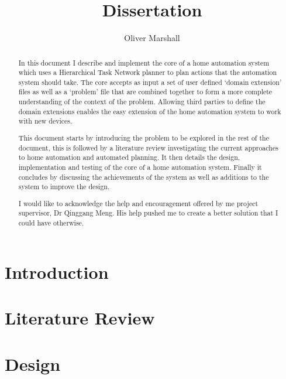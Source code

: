 \documentclass{report}
\begin{document}
% 

\title{Dissertation} \author{Oliver Marshall}

\newpage

\begin{abstract}
  In this document I describe and implement the core of a home automation system
  which uses a Hierarchical Task Network planner to plan actions that the
  automation system should take. The core accepts as input a set of user defined
  `domain extension' files as well as a `problem' file that are combined
  together to form a more complete understanding of the context of the problem.
  Allowing third parties to define the domain extensions enables the easy
  extension of the home automation system to work with new devices.

  This document starts by introducing the problem to be explored in the rest of
  the document, this is followed by a literature review investigating the
  current approaches to home automation and automated planning. It then details
  the design, implementation and testing of the core of a home automation
  system. Finally it concludes by discussing the achievements of the system as
  well as additions to the system to improve the design.
\end{abstract}
\newpage

\renewcommand{\abstractname}{Acknowledgments}
\begin{abstract}
  I would like to acknowledge the help and encouragement offered by me project
  supervisor, Dr Qinggang Meng. His help pushed me to create a better solution
  that I could have otherwise.
\end{abstract}
\newpage

\tableofcontents
\newpage

\listoffigures
\newpage

\chapter{Introduction}


\chapter{Literature Review}


\chapter{Design}

\end{document}
